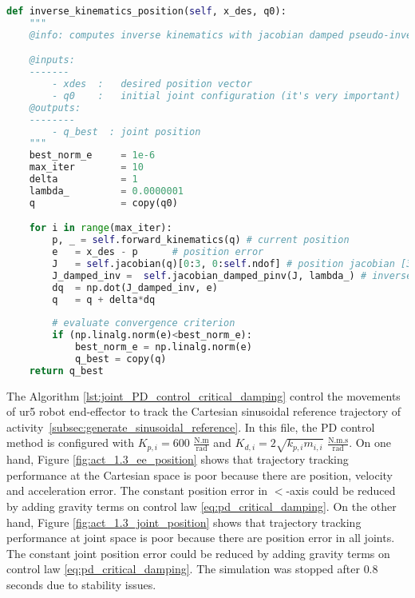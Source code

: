 \begin{lstlisting}[language=Python,caption=Function to compute inverse kinematics with jacobian damped psedo-inverse method., label={lst:inverse_kinematics}]
def inverse_kinematics_position(self, x_des, q0):
    """
    @info: computes inverse kinematics with jacobian damped pseudo-inverse.

    @inputs:
    -------
        - xdes  :   desired position vector
        - q0    :   initial joint configuration (it's very important)
    @outputs:
    --------        
        - q_best  : joint position
    """         
    best_norm_e     = 1e-6 
    max_iter        = 10
    delta           = 1
    lambda_         = 0.0000001
    q               = copy(q0)

    for i in range(max_iter):
        p, _ = self.forward_kinematics(q) # current position
        e   = x_des - p      # position error
        J   = self.jacobian(q)[0:3, 0:self.ndof] # position jacobian [3x6]
        J_damped_inv =  self.jacobian_damped_pinv(J, lambda_) # inverse jacobian [6x3]
        dq  = np.dot(J_damped_inv, e)
        q   = q + delta*dq
                   
        # evaluate convergence criterion
        if (np.linalg.norm(e)<best_norm_e):
            best_norm_e = np.linalg.norm(e)
            q_best = copy(q) 
    return q_best 
\end{lstlisting}

The Algorithm \ref{lst:joint_PD_control_critical_damping} control the movements of ur5 robot end-effector to track the Cartesian sinusoidal reference trajectory of activity~\ref{subsec:generate_sinusoidal_reference}. In this file, the PD control method is configured with ${K_{p,i}}=600$ $\mathrm{\frac{N.m}{rad}}$ and $K_{d,i}= 2 \sqrt{k_{p,i} m_{i,i}} $ $\mathrm{\frac{N.m.s}{rad}}$. On one hand, Figure \ref{fig:act_1.3_ee_position} shows that trajectory tracking performance at the Cartesian space is poor because there are position, velocity and acceleration error. The constant position error in $<$-axis could be reduced by adding gravity terms on control law \eqref{eq:pd_critical_damping}. On the other hand, Figure \ref{fig:act_1.3_joint_position} shows that trajectory tracking performance at joint space is poor because there are position error in all joints. The constant joint position error could be reduced by adding gravity terms on control law \eqref{eq:pd_critical_damping}. The simulation was stopped after $0.8$ seconds due to stability issues. 

